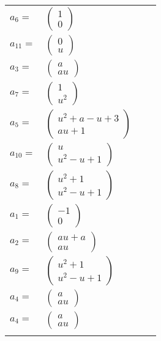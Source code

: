 \documentclass[1p]{elsarticle_modified}
\theoremstyle{definition}
\begin{document}
\begin{tabular}{m{7pt} m{180pt} m{7pt} m{180pt} }
\flushright $a_{6}=$&$\begin{pmatrix}1\\0\end{pmatrix}$ \\
\flushright $a_{11}=$&$\begin{pmatrix}0\\u\end{pmatrix}$ \\
\flushright $a_{3}=$&$\begin{pmatrix}a\\a u\end{pmatrix}$ \\
\flushright $a_{7}=$&$\begin{pmatrix}1\\u^2\end{pmatrix}$ \\
\flushright $a_{5}=$&$\begin{pmatrix}u^2+a- u+3\\a u+1\end{pmatrix}$ \\
\flushright $a_{10}=$&$\begin{pmatrix}u\\u^2- u+1\end{pmatrix}$ \\
\flushright $a_{8}=$&$\begin{pmatrix}u^2+1\\u^2- u+1\end{pmatrix}$ \\
\flushright $a_{1}=$&$\begin{pmatrix}-1\\0\end{pmatrix}$ \\
\flushright $a_{2}=$&$\begin{pmatrix}a u+a\\a u\end{pmatrix}$ \\
\flushright $a_{9}=$&$\begin{pmatrix}u^2+1\\u^2- u+1\end{pmatrix}$ \\
\flushright $a_{4}=$&$\begin{pmatrix}a\\a u\end{pmatrix}$\\ \flushright $a_{4}=$&$\begin{pmatrix}a\\a u\end{pmatrix}$\\&\end{tabular}
\end{document}
